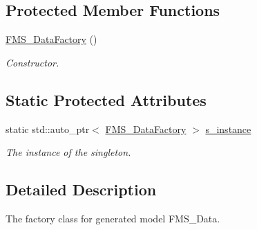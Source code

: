 \subsection*{Protected Member Functions}
\begin{DoxyCompactItemize}
\item 
\hypertarget{classFMS__Data_1_1FMS__DataFactory_ab0a7fcf01ccca46d35d437d85fe6a0e7}{
\hyperlink{classFMS__Data_1_1FMS__DataFactory_ab0a7fcf01ccca46d35d437d85fe6a0e7}{FMS\_\-DataFactory} ()}
\label{classFMS__Data_1_1FMS__DataFactory_ab0a7fcf01ccca46d35d437d85fe6a0e7}

\begin{DoxyCompactList}\small\item\em Constructor. \item\end{DoxyCompactList}\end{DoxyCompactItemize}
\subsection*{Static Protected Attributes}
\begin{DoxyCompactItemize}
\item 
\hypertarget{classFMS__Data_1_1FMS__DataFactory_aef206591f10c6774424a9b9631020c2f}{
static std::auto\_\-ptr$<$ \hyperlink{classFMS__Data_1_1FMS__DataFactory}{FMS\_\-DataFactory} $>$ \hyperlink{classFMS__Data_1_1FMS__DataFactory_aef206591f10c6774424a9b9631020c2f}{s\_\-instance}}
\label{classFMS__Data_1_1FMS__DataFactory_aef206591f10c6774424a9b9631020c2f}

\begin{DoxyCompactList}\small\item\em The instance of the singleton. \item\end{DoxyCompactList}\end{DoxyCompactItemize}


\subsection{Detailed Description}
The factory class for generated model FMS\_\-Data. 

